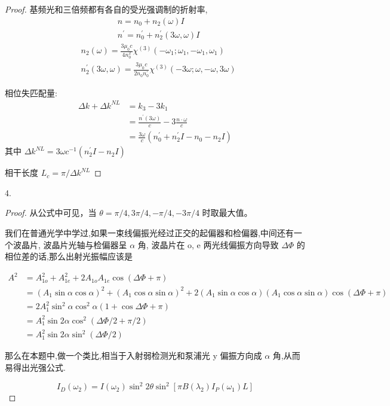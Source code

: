 \begin{proof}
基频光和三倍频都有各自的受光强调制的折射率,
$$
\begin{aligned}
&n=n_{0}+n_{2}(\omega) I\\
&n^{\prime}=n_{0}^{\prime}+n_{2}^{\prime} (3\omega,\omega) I
\end{aligned}
$$
$$
\begin{aligned}
&n_{2}\left(\omega\right)=\frac{3 \mu_{0} c}{4 n_{0}^{2}} \chi^{(3)}\left(-\omega_{1} ; \omega_{1},-\omega_{1}, \omega_{1}\right)\\
&n_{2}^\prime\left(3\omega, \omega\right)=\frac{3 \mu_{0} c}{2 n_{0} n_{0}^\prime} \chi^{(3)}\left(-3\omega ; \omega,-\omega, 3\omega\right)
\end{aligned}
$$


相位失匹配量:
$$
\begin{aligned}
\Delta k+\Delta k^{NL} &=k_{3}-3 k_{1} \\
&=\frac{n^{\prime}(3 \omega)}{c}-3 \frac{n \cdot \omega}{c} \\
&=\frac{3 \omega}{c}\left(n_{0}^{\prime}+n_{2}^{\prime} I-n_{0}-n_{2} I\right)
\end{aligned}
$$
其中 $\Delta k^{NL} = 3 \omega c^{-1} \left(n_{2}^{\prime} I-n_{2} I\right)$

相干长度 $L_c=\pi / \Delta k^{NL}$
\end{proof}

\begin{exercise}
4.
\end{exercise}

\begin{proof}
从公式中可见，当 $\theta = \pi/4, 3\pi/4, -\pi/4, -3\pi/4$ 时取最大值。

我们在普通光学中学过,如果一束线偏振光经过正交的起偏器和检偏器,中间还有一个波晶片,
波晶片光轴与检偏器呈 $\alpha$ 角,
波晶片在 o, e 两光线偏振方向导致 $\Delta \Phi$ 的相位差的话,那么出射光振幅应该是

$$
\begin{aligned}
A^2&=A_{1o}^2+A_{1e}^2+2A_{1o}A_{1e}\cos(\Delta \Phi +\pi)\\
&=(A_1 \sin \alpha\cos\alpha)^2+(A_1 \cos\alpha\sin\alpha)^2+
2(A_1\sin\alpha\cos\alpha)(A_1 \cos\alpha\sin\alpha)\cos(\Delta \Phi +\pi)\\
&=2A_1^2\sin^2\alpha\cos^2\alpha(1+\cos{\Delta\Phi+\pi})\\
&=A_1^2\sin2\alpha\cos^2(\Delta\Phi/2+\pi/2)\\
&=A_1^2\sin2\alpha\sin^2(\Delta\Phi/2)
\end{aligned}
$$

那么在本题中,做一个类比,相当于入射弱检测光和泵浦光 y 偏振方向成 $\alpha$ 角,从而易得出光强公式.

$$
I_{D}\left(\omega_{2}\right)=I\left(\omega_{2}\right) \sin ^{2} 2 \theta \sin ^{2}\left[\pi B\left(\lambda_{2}\right) I_{P}\left(\omega_{1}\right) L\right]
$$

\end{proof}

